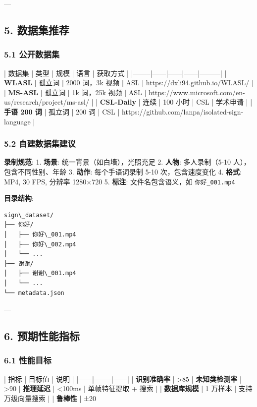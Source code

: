 \documentclass[a4paper,12pt]{article}
\begin{document}
---

\subsection{5. 数据集推荐}

\subsubsection{5.1 公开数据集}

| 数据集 | 类型 | 规模 | 语言 | 获取方式 |
|--------|------|------|------|---------|
| \textbf{WLASL} | 孤立词 | 2000 词，3k 视频 | ASL | https://dxli94.github.io/WLASL/ |
| \textbf{MS-ASL} | 孤立词 | 1k 词，25k 视频 | ASL | https://www.microsoft.com/en-us/research/project/ms-asl/ |
| \textbf{CSL-Daily} | 连续 | 100 小时 | CSL | 学术申请 |
| \textbf{手语 200 词} | 孤立词 | 200 词 | CSL | https://github.com/lanpa/isolated-sign-language |

\subsubsection{5.2 自建数据集建议}

\textbf{录制规范}:
1. \textbf{场景}: 统一背景（如白墙），光照充足
2. \textbf{人物}: 多人录制（5-10 人），包含不同性别、年龄
3. \textbf{动作}: 每个手语词录制 5-10 次，包含速度变化
4. \textbf{格式}: MP4, 30 FPS, 分辨率 1280×720
5. \textbf{标注}: 文件名包含语义，如 \texttt{你好_001.mp4}

\textbf{目录结构}:
\begin{verbatim}
sign\_dataset/
├── 你好/
│   ├── 你好\_001.mp4
│   ├── 你好\_002.mp4
│   └── ...
├── 谢谢/
│   ├── 谢谢\_001.mp4
│   └── ...
└── metadata.json
\end{verbatim}


---

\subsection{6. 预期性能指标}

\subsubsection{6.1 性能目标}

| 指标 | 目标值 | 说明 |
|------|--------|------|
| \textbf{识别准确率} | >85%
| \textbf{未知类检测率} | >90%
| \textbf{推理延迟} | <100ms | 单帧特征提取 + 搜索 |
| \textbf{数据库规模} | 1 万样本 | 支持万级向量搜索 |
| \textbf{鲁棒性} | ±20%
\end{document}
